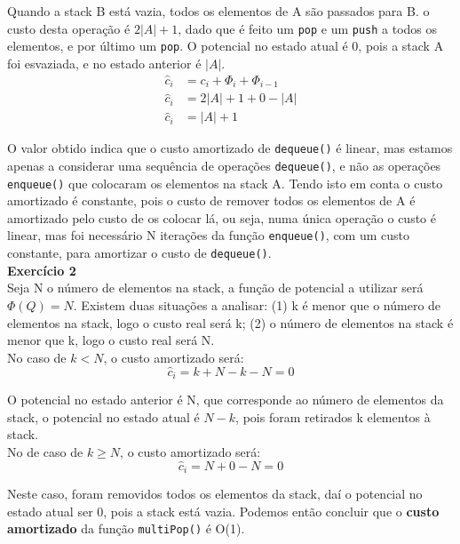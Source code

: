 \documentclass[a4paper,11pt]{article}
\begin{document}
	\noindent Quando a stack B está vazia, todos os elementos de A são passados para B. o custo desta operação é $ 2 |A| + 1 $, dado que é feito um \texttt{pop} e um \texttt{push} a todos os elementos, e por último um \texttt{pop}. O potencial no estado atual é 0, pois a stack A foi esvaziada, e no estado anterior é $|A|$.
	\begin{align*}
		\hat{c}_i & = c_i + \Phi_i + \Phi_{i-1} \\
		\hat{c}_i & = 2 |A| + 1 + 0 - |A| \\
		\hat{c}_i & = |A| + 1
	\end{align*}
		
	\noindent O valor obtido indica que o custo amortizado de \texttt{dequeue()} é linear, mas estamos apenas a considerar uma sequência de operações \texttt{dequeue()}, e não as operações \texttt{enqueue()} que colocaram os elementos na stack A. Tendo isto em conta o custo amortizado é constante, pois o custo de remover todos os elementos de A é amortizado pelo custo de os colocar lá, ou seja, numa única operação o custo é linear, mas foi necessário N iterações da função \texttt{enqueue()}, com um custo constante, para amortizar o custo de \texttt{dequeue()}.\\
	
	\noindent \textbf{Exercício 2}\\
	
	\noindent Seja N o número de elementos na stack, a função de potencial a utilizar será $\Phi(Q) = N$. Existem duas situações a analisar: (1) k é menor que o número de elementos na stack, logo o custo real será k; (2) o número de elementos na stack é menor que k, logo o custo real será N.\\
	
	\noindent No caso de $ k < N $, o custo amortizado será:
	\[
		\hat{c}_i = k + N - k - N = 0
	\]
	
	\noindent O potencial no estado anterior é N, que corresponde ao número de elementos da stack, o potencial no estado atual é $ N - k $, pois foram retirados k elementos à stack.\\
	
	\noindent No de caso de $ k \geq N $, o custo amortizado será:
	\[
		\hat{c}_i = N + 0 - N = 0
	\]
	
	\noindent Neste caso, foram removidos todos os elementos da stack, daí o potencial no estado atual ser 0, pois a stack está vazia. Podemos então concluir que o \textbf{custo amortizado} da função \texttt{multiPop()} é O(1).\\
	
\end{document}
